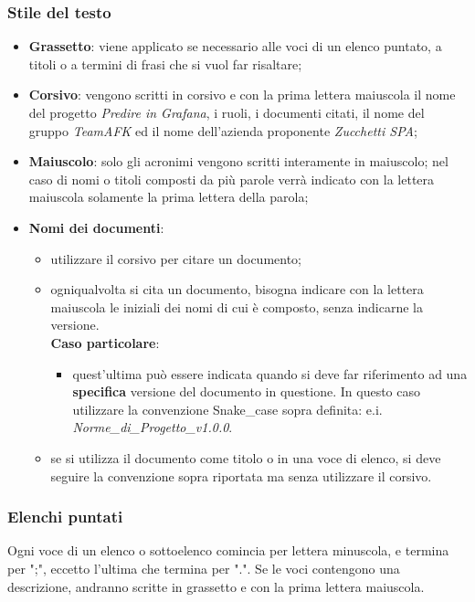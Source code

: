 \subsubsection{Stile del testo}
\begin{itemize}
\item \textbf{Grassetto}: viene applicato se necessario alle voci di un elenco puntato, a titoli o a termini di frasi che si vuol far risaltare;
\item \textbf{Corsivo}: vengono scritti in corsivo e con la prima lettera maiuscola il nome del progetto \textit{Predire in Grafana}, i ruoli, i documenti citati, il nome del gruppo \textit{TeamAFK} ed il nome dell'azienda proponente \textit{Zucchetti SPA};
\item \textbf{Maiuscolo}: solo gli acronimi vengono scritti interamente in maiuscolo; nel caso di nomi o titoli composti da più parole verrà indicato con la lettera maiuscola solamente la prima lettera della parola;
\item \textbf{Nomi dei documenti}: 
\begin{itemize}
\item utilizzare il corsivo per citare un documento;
\item ogniqualvolta si cita un documento, bisogna indicare con la lettera maiuscola le iniziali dei nomi di cui è composto, senza indicarne la versione. \\ \textbf{Caso particolare}:
\begin{itemize}
\item quest'ultima può essere indicata quando si deve far riferimento ad una \textbf{specifica} versione del documento in questione. In questo caso utilizzare la convenzione Snake\_case sopra definita: e.i. \textit{Norme\_di\_Progetto\_v1.0.0}.
\end{itemize}
\item se si utilizza il documento come titolo o in una voce di elenco, si deve seguire la convenzione sopra riportata ma senza utilizzare il corsivo. 
\end{itemize}
\end{itemize}

\subsubsection{Elenchi puntati}
Ogni voce di un elenco o sottoelenco comincia per lettera minuscola, e termina per ";", eccetto l'ultima che termina per ".". 
Se le voci contengono una descrizione, andranno scritte in grassetto e con la prima lettera maiuscola.

